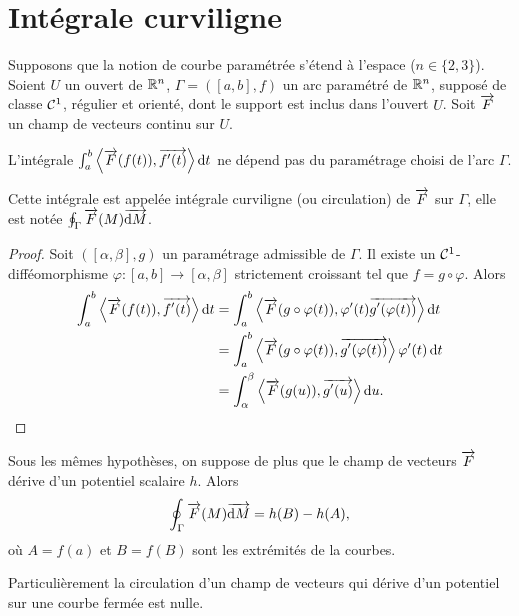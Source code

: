 \section{Intégrale curviligne}

Supposons que la notion de courbe paramétrée s'étend à l'espace (\(n \in \{2, 3\}\)). Soient \(U\) un ouvert de \(\mathbb{R}^n\), \(\Gamma=([a,b], f)\) un arc paramétré de \(\mathbb{R}^n\), supposé de classe \(\mathcal{C}^{1}\), régulier et orienté, dont le support est inclus dans l'ouvert \(U\). Soit \(\overrightarrow{F}\) un champ de vecteurs continu sur \(U\).

\begin{prop}
  L'intégrale \(\int_a^b \left\langle{\overrightarrow{F}(f(t))},{\overrightarrow{f'(t)}}\right\rangle \mathop{}\mathopen{}\mathrm{d} t\) ne dépend pas du paramétrage choisi de l'arc \(\Gamma\).
\end{prop}
\begin{defdef}
  Cette intégrale est appelée intégrale curviligne (ou circulation) de \(\overrightarrow{F}\) sur \(\Gamma\), elle est notée \(\oint_\Gamma \overrightarrow{F}(M)\overrightarrow{\mathop{}\mathopen{}\mathrm{d} M}\).
\end{defdef}
\begin{proof}
  Soit \(([\alpha, \beta], g)\) un paramétrage admissible de \(\Gamma\). Il existe un \(\mathcal{C}^{1}\)-difféomorphisme \(\varphi : [a, b] \rightarrow [\alpha, \beta]\) strictement croissant tel que \(f=g \circ \varphi\).  Alors
  \begin{align}
    \int_a^b \left\langle{\overrightarrow{F}(f(t))},{\overrightarrow{f'(t)}}\right\rangle \mathop{}\mathopen{}\mathrm{d} t &= \int_a^b \left\langle{\overrightarrow{F}(g \circ \varphi(t))},{\varphi'(t)\overrightarrow{g'(\varphi(t))}}\right\rangle \mathop{}\mathopen{}\mathrm{d} t \\
    &=\int_a^b \left\langle{\overrightarrow{F}(g \circ \varphi(t))},{\overrightarrow{g'(\varphi(t))}}\right\rangle \varphi'(t)\mathop{}\mathopen{}\mathrm{d} t \\
    &=\int_\alpha^\beta \left\langle{\overrightarrow{F}(g(u))},{\overrightarrow{g'(u)}}\right\rangle \mathop{}\mathopen{}\mathrm{d} u.
  \end{align}
\end{proof}

\begin{prop}
  Sous les mêmes hypothèses, on suppose de plus que le champ de vecteurs \(\overrightarrow{F}\) dérive d'un potentiel scalaire \(h\). Alors
  \begin{equation}
    \oint_\Gamma \overrightarrow{F}(M)\overrightarrow{\mathop{}\mathopen{}\mathrm{d} M} = h(B)-h(A),
  \end{equation}
  où \(A=f(a)\) et \(B=f(B)\) sont les extrémités de la courbes.
\end{prop}

Particulièrement la circulation d'un champ de vecteurs qui dérive d'un potentiel sur une courbe fermée est nulle.


